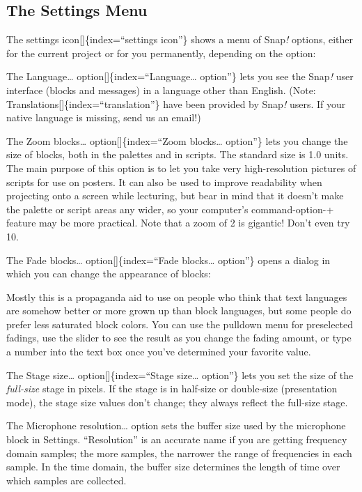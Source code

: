 \documentclass[
  letterpaper,
]{book}
\begin{document}
\subsection{The Settings Menu}\label{the-settings-menu}

The settings icon{[}{]}\{index=``settings icon''\} shows a menu of
Snap\emph{!} options, either for the current project or for you
permanently, depending on the option:

The Language\ldots{} option{[}{]}\{index=``Language\ldots{} option''\}
lets you see the Snap\emph{!} user interface (blocks and messages) in a
language other than English. (Note:
Translations{[}{]}\{index=``translation''\} have been provided by
Snap\emph{!} users. If your native language is missing, send us an
email!)

The Zoom blocks\ldots{} option{[}{]}\{index=``Zoom blocks\ldots{}
option''\} lets you change the size of blocks, both in the palettes and
in scripts. The standard size is 1.0 units. The main purpose of this
option is to let you take very high-resolution pictures of scripts for
use on posters. It can also be used to improve readability when
projecting onto a screen while lecturing, but bear in mind that it
doesn't make the palette or script areas any wider, so your computer's
command-option-+ feature may be more practical. Note that a zoom of 2 is
gigantic! Don't even try 10.

The Fade blocks\ldots{} option{[}{]}\{index=``Fade blocks\ldots{}
option''\} opens a dialog in which you can change the appearance of
blocks:

Mostly this is a propaganda aid to use on people who think that text
languages are somehow better or more grown up than block languages, but
some people do prefer less saturated block colors. You can use the
pulldown menu for preselected fadings, use the slider to see the result
as you change the fading amount, or type a number into the text box once
you've determined your favorite value.

The Stage size\ldots{} option{[}{]}\{index=``Stage size\ldots{}
option''\} lets you set the size of the \emph{full-size} stage in
pixels. If the stage is in half-size or double-size (presentation mode),
the stage size values don't change; they always reflect the full-size
stage.

The Microphone resolution\ldots{} option sets the buffer size used by
the microphone block in Settings. ``Resolution'' is an accurate name if
you are getting frequency domain samples; the more samples, the narrower
the range of frequencies in each sample. In the time domain, the buffer
size determines the length of time over which samples are collected.
\end{document}
